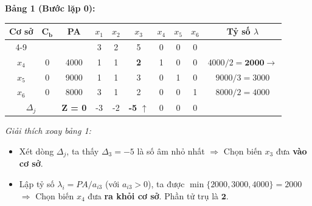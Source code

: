 \textbf{Bảng 1 (Bước lặp 0):}
\begin{table}[H]
    \centering
    \renewcommand{\arraystretch}{1.3}
    \begin{tabular}{|c|c|c|c|c|c|c|c|c|c|}
        \hline
        \multirow{2}{*}{\textbf{Cơ sở}} & \multirow{2}{*}{$\mathbf{C_b}$} & \multirow{2}{*}{\textbf{PA}} & $x_1$ & $x_2$ & $x_3$ & $x_4$ & $x_5$ & $x_6$ & \multirow{2}{*}{\textbf{Tỷ số $\lambda$}} \\
        \cline{4-9}
        & & & 3 & 2 & 5 & 0 & 0 & 0 & \\
        \hline
        $x_4$ & 0 & 4000 & 1 & 1 & \textbf{2} & 1 & 0 & 0 & $4000/2 = \mathbf{2000} \rightarrow$ \\
        \hline
        $x_5$ & 0 & 9000 & 1 & 1 & 3 & 0 & 1 & 0 & $9000/3 = 3000$ \\
        \hline
        $x_6$ & 0 & 8000 & 3 & 1 & 2 & 0 & 0 & 1 & $8000/2 = 4000$ \\
        \hline
        \multicolumn{2}{|c|}{$\Delta_j$} & \textbf{Z = 0} & -3 & -2 & \textbf{-5} $\uparrow$ & 0 & 0 & 0 & \\
        \hline
    \end{tabular}
\end{table}
\textit{Giải thích xoay bảng 1:}
\begin{itemize}[itemsep=0pt, parsep=0pt, topsep=0pt]
    \item Xét dòng $\Delta_j$, ta thấy $\Delta_3 = -5$ là số âm nhỏ nhất $\Rightarrow$ Chọn biến $x_3$ đưa \textbf{vào cơ sở}.
    \item Lập tỷ số $\lambda_i = PA / a_{i3}$ (với $a_{i3} > 0$), ta được $\min\{2000, 3000, 4000\} = 2000$ $\Rightarrow$ Chọn biến $x_4$ đưa \textbf{ra khỏi cơ sở}. Phần tử trụ là $\mathbf{2}$.
\end{itemize}

